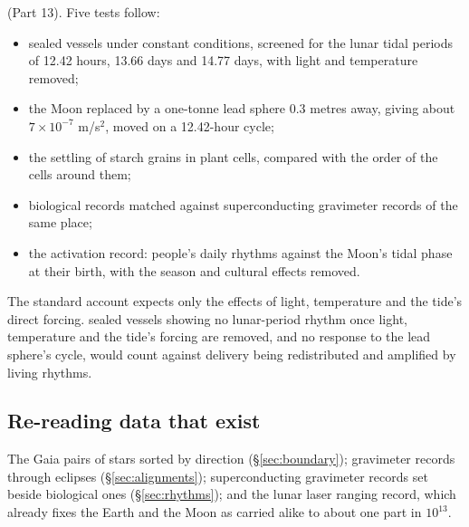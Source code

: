 (Part 13). Five tests follow:
\begin{itemize}
\item sealed vessels under constant conditions, screened for the lunar tidal periods of 12.42 hours, 13.66 days and 14.77 days, with light and temperature removed;
\item the Moon replaced by a one-tonne lead sphere 0.3 metres away, giving about $7\times10^{-7}$ m/s$^2$, moved on a 12.42-hour cycle;
\item the settling of starch grains in plant cells, compared with the order of the cells around them;
\item biological records matched against superconducting gravimeter records of the same place;
\item the activation record: people's daily rhythms against the Moon's tidal phase at their birth, with the season and cultural effects removed.
\end{itemize}
The standard account expects only the effects of light, temperature and the tide's direct forcing.  sealed vessels showing no lunar-period rhythm once light, temperature and the tide's forcing are removed, and no response to the lead sphere's cycle, would count against delivery being redistributed and amplified by living rhythms.

\subsection{Re-reading data that exist}

 The Gaia pairs of stars sorted by direction (§\ref{sec:boundary}); gravimeter records through eclipses (§\ref{sec:alignments}); superconducting gravimeter records set beside biological ones (§\ref{sec:rhythms}); and the lunar laser ranging record, which already fixes the Earth and the Moon as carried alike to about one part in $10^{13}$.


